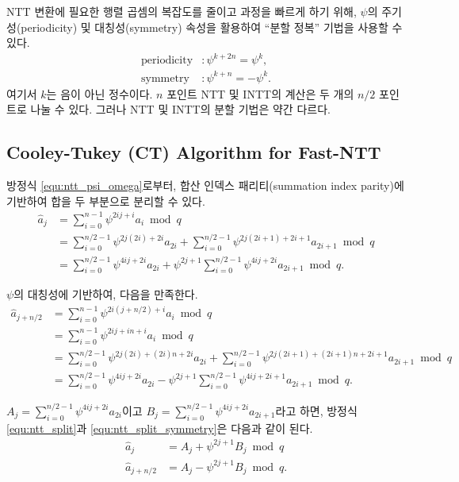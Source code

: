 NTT 변환에 필요한 행렬 곱셈의 복잡도를 줄이고 과정을 빠르게 하기 위해, $\psi$의 주기성(periodicity) 및 대칭성(symmetry) 속성을 활용하여 ``분할 정복'' 기법을 사용할 수 있다.
\begin{align*}
\text{periodicity} &: \psi^{k+2n} = \psi^k, \\
\text{symmetry} &: \psi^{k+n} = -\psi^k.
\end{align*}
여기서 $k$는 음이 아닌 정수이다. $n$ 포인트 NTT 및 INTT의 계산은 두 개의 $n/2$ 포인트로 나눌 수 있다. 그러나 NTT 및 INTT의 분할 기법은 약간 다르다.

\subsection{Cooley-Tukey (CT) Algorithm for Fast-NTT}
\label{sec:ct_algorithm}

방정식 \ref{equ:ntt_psi_omega}로부터, 합산 인덱스 패리티(summation index parity)에 기반하여 합을 두 부분으로 분리할 수 있다.
\begin{equation}
\begin{split}
\label{equ:ntt_split}
\hat{a}_j &= \sum_{i=0}^{n-1} \psi^{2ij+i} a_i \bmod q \\
&= \sum_{i=0}^{n/2-1} \psi^{2j(2i)+2i} a_{2i} + \sum_{i=0}^{n/2-1} \psi^{2j(2i+1)+2i+1} a_{2i+1} \bmod q \\
&= \sum_{i=0}^{n/2-1} \psi^{4ij+2i} a_{2i} + \psi^{2j+1} \sum_{i=0}^{n/2-1} \psi^{4ij+2i} a_{2i+1} \bmod q.
\end{split}
\end{equation}

$\psi$의 대칭성에 기반하여, 다음을 만족한다.
\begin{equation}
\label{equ:ntt_split_symmetry}
\begin{split}
\hat{a}_{j+n/2} &= \sum_{i=0}^{n-1} \psi^{2i(j+n/2)+i} a_i \bmod q \\
&= \sum_{i=0}^{n-1} \psi^{2ij+in+i} a_i \bmod q \\
&= \sum_{i=0}^{n/2-1} \psi^{2j(2i)+(2i)n+2i} a_{2i} + \sum_{i=0}^{n/2-1} \psi^{2j(2i+1)+(2i+1)n+2i+1} a_{2i+1} \bmod q \\
&= \sum_{i=0}^{n/2-1} \psi^{4ij+2i} a_{2i} - \psi^{2j+1} \sum_{i=0}^{n/2-1} \psi^{4ij+2i+1} a_{2i+1} \bmod q.
\end{split}
\end{equation}

$A_j = \sum_{i=0}^{n/2-1} \psi^{4ij+2i} a_{2i}$이고 $B_j = \sum_{i=0}^{n/2-1} \psi^{4ij+2i} a_{2i+1}$라고 하면, 방정식 \ref{equ:ntt_split}과 \ref{equ:ntt_split_symmetry}은 다음과 같이 된다.
\begin{equation}
\begin{split}
\label{equ:ntt_split_butterfly}
\hat{a}_j &= A_j + \psi^{2j+1} B_j \bmod q \\
\hat{a}_{j+n/2} &= A_j - \psi^{2j+1} B_j \bmod q.
\end{split}
\end{equation}

